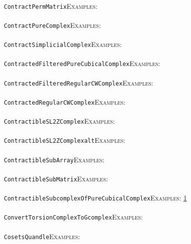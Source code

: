 \documentclass[a4paper,11pt]{report}
\begin{document}
{{ \\
 \texttt{ContractPermMatrix}{\nobreakspace}{\nobreakspace}{\nobreakspace}{\nobreakspace}\textsc{Examples:} \\
 \\
 \texttt{ContractPureComplex}{\nobreakspace}{\nobreakspace}{\nobreakspace}{\nobreakspace}\textsc{Examples:} \\
 \\
 \texttt{ContractSimplicialComplex}{\nobreakspace}{\nobreakspace}{\nobreakspace}{\nobreakspace}\textsc{Examples:} \\
 \\
 \texttt{ContractedFilteredPureCubicalComplex}{\nobreakspace}{\nobreakspace}{\nobreakspace}{\nobreakspace}\textsc{Examples:} \\
 \\
 \texttt{ContractedFilteredRegularCWComplex}{\nobreakspace}{\nobreakspace}{\nobreakspace}{\nobreakspace}\textsc{Examples:} \\
 \\
 \texttt{ContractedRegularCWComplex}{\nobreakspace}{\nobreakspace}{\nobreakspace}{\nobreakspace}\textsc{Examples:} \\
 \\
 \texttt{ContractibleSL2ZComplex}{\nobreakspace}{\nobreakspace}{\nobreakspace}{\nobreakspace}\textsc{Examples:} \\
 \\
 \texttt{ContractibleSL2ZComplex{\textunderscore}alt}{\nobreakspace}{\nobreakspace}{\nobreakspace}{\nobreakspace}\textsc{Examples:} \\
 \\
 \texttt{ContractibleSubArray}{\nobreakspace}{\nobreakspace}{\nobreakspace}{\nobreakspace}\textsc{Examples:} \\
 \\
 \texttt{ContractibleSubMatrix}{\nobreakspace}{\nobreakspace}{\nobreakspace}{\nobreakspace}\textsc{Examples:} \\
 \\
 \texttt{ContractibleSubcomplexOfPureCubicalComplex}{\nobreakspace}{\nobreakspace}{\nobreakspace}{\nobreakspace}\textsc{Examples:} \href{../www/SideLinks/About/aboutCubical.html} {1}{\nobreakspace} \\
 \\
 \texttt{ConvertTorsionComplexToGcomplex}{\nobreakspace}{\nobreakspace}{\nobreakspace}{\nobreakspace}\textsc{Examples:} \\
 \\
 \texttt{CosetsQuandle}{\nobreakspace}{\nobreakspace}{\nobreakspace}{\nobreakspace}\textsc{Examples:} \\
}}
\end{document}
